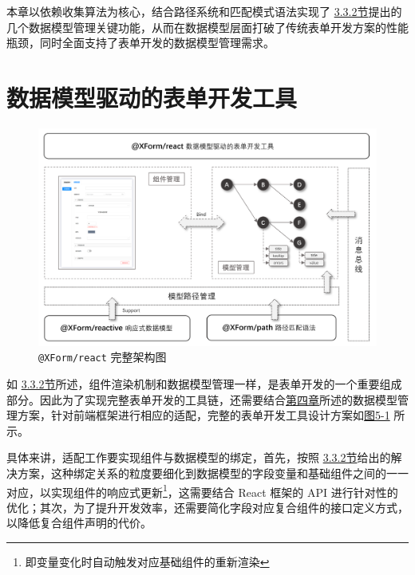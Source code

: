 \documentclass[winfonts,master,twoside]{njuthesis}
\makeatletter
\newcommand{\xform}[1]{\texttt{@XForm/#1}}
\makeatother
\begin{document}
本章以依赖收集算法为核心，结合路径系统和匹配模式语法实现了 \hyperref[final-solution]{3.3.2节}提出的几个数据模型管理关键功能，从而在数据模型层面打破了传统表单开发方案的性能瓶颈，同时全面支持了表单开发的数据模型管理需求。

\chapter{数据模型驱动的表单开发工具}\label{datamodel-driven-form-development-toolkit}

\begin{figure}[h]
    \centering
    \includegraphics[width=\textwidth]{figure/chapter-4/overview-final-update.png}
    \caption{\xform{react} 完整架构图}
    \label{overview-final}
\end{figure}

如 \hyperref[final-solution]{3.3.2节}所述，组件渲染机制和数据模型管理一样，是表单开发的一个重要组成部分。因此为了实现完整表单开发的工具链，还需要结合\hyperref[reactive-datamodel-based-on-path-system]{第四章}所述的数据模型管理方案，针对前端框架进行相应的适配，完整的表单开发工具设计方案如\hyperref[overview-final]{图5-1} 所示。

具体来讲，适配工作要实现组件与数据模型的绑定，首先，按照 \hyperref[final-solution]{3.3.2节}给出的解决方案，这种绑定关系的粒度要细化到数据模型的字段变量和基础组件之间的一一对应，以实现组件的响应式更新\footnote{即变量变化时自动触发对应基础组件的重新渲染}，这需要结合 React 框架的 API 进行针对性的优化；其次，为了提升开发效率，还需要简化字段对应复合组件的接口定义方式，以降低复合组件声明的代价。

\end{document}
